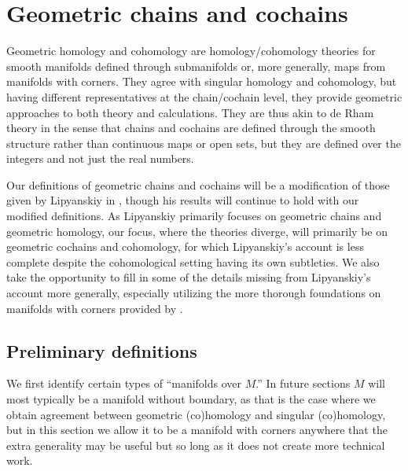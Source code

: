 
\section{Geometric chains and cochains}\label{S: geometric cochains}

Geometric homology and cohomology are homology/cohomology theories for smooth manifolds defined through submanifolds or, more generally, maps from manifolds with corners.
They agree with singular homology and cohomology, but having different representatives
at the chain/cochain level, they provide geometric approaches to both theory and calculations.
They are thus akin to de Rham theory in the sense that chains and cochains are defined through the smooth structure rather than continuous maps or open sets, but they are defined over the integers and not just the real numbers.

Our definitions of geometric chains and cochains will be a modification of those given by Lipyanskiy in \cite{Lipy14}, though his results will continue to hold with our modified definitions.
As Lipyanskiy primarily focuses on geometric chains and geometric homology, our focus, where the theories diverge, will primarily be on geometric cochains and cohomology, for which Lipyanskiy's account is less complete despite the cohomological setting having its own subtleties.
We also take the opportunity to fill in some of the details missing from Lipyanskiy's account more generally, especially utilizing the more thorough foundations on manifolds with corners provided by \cite{Joy12,MaDo92}.

\subsection{Preliminary definitions}

We first identify certain types of ``manifolds over $M$.'' In future sections $M$ will most typically be a manifold without boundary, as that is the case where we obtain agreement between geometric (co)homology and singular (co)homology, but in this section we allow it to be a manifold with corners anywhere that the extra generality may be useful but so long as it does not create more technical work.

